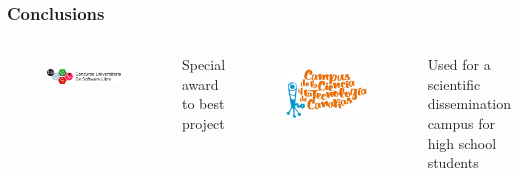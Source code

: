 \documentclass{beamer}
\begin{document}
\begin{frame}
\frametitle{Conclusions}
 
 \begin{columns}
    \centering
    \begin{figure}
        \centering
        \includegraphics[scale=0.22]{pres/img/conclusions/cusl.png}
        \label{fig:my_label}
    \end{figure}
    \begin{center}
        Special award to best project
    \end{center}
    \begin{figure}
        \centering
        \includegraphics[scale=0.18]{pres/img/conclusions/cctc.png}
        \label{fig:my_label}
    \end{figure}
    \begin{center}
        Used for a scientific dissemination campus for high school students 
    \end{center}
 \end{columns}
 
\end{frame}
\end{document}
